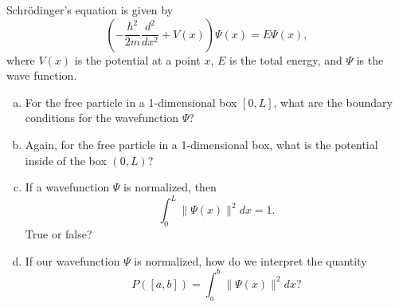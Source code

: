 \begin{problem}
Schr\"odinger's equation is given by
\[
\left(-\frac{\hbar^2}{2m}\frac{d^2}{dx^2}+V(x)\right)\Psi(x)=E\Psi(x),
\]
where $V(x)$ is the potential at a point $x$, $E$ is the total energy, and $\Psi$ is the wave function.
\begin{enumerate}[(a)]
    \item For the free particle in a 1-dimensional box $[0,L]$, what are the boundary conditions for the wavefunction $\Psi$?
    \vspace*{3cm}
    \item Again, for the free particle in a 1-dimensional box, what is the potential inside of the box $(0,L)$?
    \vspace*{3cm}
    \item If a wavefunction $\Psi$ is normalized, then
    \[
    \int_0^L \|\Psi(x)\|^2dx=1.
    \]
    True or false?
    \vspace*{3cm}
    \item If our wavefunction $\Psi$ is normalized, how do we interpret the quantity
    \[
    P([a,b])=\int_a^b \|\Psi(x)\|^2dx?
    \]
    \vspace*{3cm}

\end{enumerate}
\end{problem}


